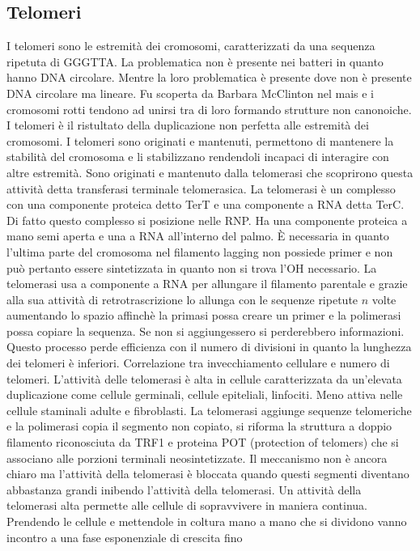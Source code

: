 \subsection{Telomeri}
I telomeri sono le estremit\`a dei cromosomi, caratterizzati da una sequenza ripetuta di GGGTTA. La problematica non \`e presente nei batteri in quanto hanno DNA circolare. Mentre
la loro problematica \`e presente dove non \`e presente DNA circolare ma lineare. Fu scoperta da Barbara McClinton nel mais e i cromosomi rotti tendono ad unirsi tra di loro formando
strutture non canonoiche. I telomeri \`e il ristultato della duplicazione non perfetta alle estremit\`a dei cromosomi. I telomeri sono originati e mantenuti, permettono di mantenere 
la stabilit\`a del cromosoma e li stabilizzano rendendoli incapaci di interagire con altre estremit\`a. Sono originati e mantenuto dalla telomerasi che scoprirono questa attivit\`a detta
transferasi terminale telomerasica. La telomerasi \`e un complesso con una componente proteica detto TerT e una componente a RNA detta TerC. Di fatto questo complesso si posizione 
nelle RNP. Ha una componente proteica a mano semi aperta e una a RNA all'interno del palmo. \`E necessaria in quanto l'ultima parte del cromosoma nel filamento lagging non possiede 
primer e non pu\`o pertanto essere sintetizzata in quanto non si trova l'OH necessario. La telomerasi usa a componente a RNA per allungare il filamento parentale e grazie alla sua 
attivit\`a di retrotrascrizione lo allunga con le sequenze ripetute $n$ volte aumentando lo spazio affinch\`e la primasi possa creare un primer e la polimerasi possa copiare la sequenza. 
Se non si aggiungessero si perderebbero informazioni. Questo processo perde efficienza con il numero di divisioni in quanto la lunghezza dei telomeri \`e inferiori. Correlazione tra 
invecchiamento cellulare e numero di telomeri. L'attivit\`a delle telomerasi \`e alta in cellule caratterizzata da un'elevata duplicazione come cellule germinali, cellule epiteliali, 
linfociti. Meno attiva nelle cellule staminali adulte e fibroblasti. La telomerasi aggiunge sequenze telomeriche e la polimerasi copia il segmento non copiato, si riforma la struttura
a doppio filamento riconosciuta da TRF1 e proteina POT (protection of telomers) che si associano alle porzioni terminali neosintetizzate. Il meccanismo non \`e ancora chiaro ma 
l'attivit\`a della telomerasi \`e bloccata quando questi segmenti diventano abbastanza grandi inibendo l'attivit\`a della telomerasi. Un attivit\`a della telomerasi alta permette
alle cellule di sopravvivere in maniera continua. Prendendo le cellule e mettendole in coltura mano a mano che si dividono vanno incontro a una fase esponenziale di crescita fino 
